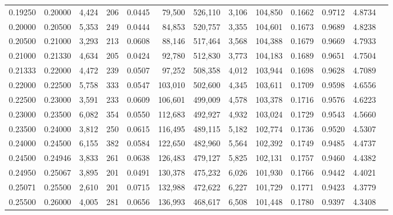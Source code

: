 \begin{tabular}{rrrrrrrrrrrrr}
0.19250 & 0.20000 & 4,424 & 206 &                                     0.0445 &  79,500 & 526,110 &   3,106 & 104,850 & 0.1662 & 0.9712 & 4.8734 \\
0.20000 & 0.20500 & 5,353 & 249 &                                     0.0444 &  84,853 & 520,757 &   3,355 & 104,601 & 0.1673 & 0.9689 & 4.8238 \\
0.20500 & 0.21000 & 3,293 & 213 &                                     0.0608 &  88,146 & 517,464 &   3,568 & 104,388 & 0.1679 & 0.9669 & 4.7933 \\
0.21000 & 0.21330 & 4,634 & 205 &                                     0.0424 &  92,780 & 512,830 &   3,773 & 104,183 & 0.1689 & 0.9651 & 4.7504 \\
0.21333 & 0.22000 & 4,472 & 239 &                                     0.0507 &  97,252 & 508,358 &   4,012 & 103,944 & 0.1698 & 0.9628 & 4.7089 \\
0.22000 & 0.22500 & 5,758 & 333 &                                     0.0547 & 103,010 & 502,600 &   4,345 & 103,611 & 0.1709 & 0.9598 & 4.6556 \\
0.22500 & 0.23000 & 3,591 & 233 &                                     0.0609 & 106,601 & 499,009 &   4,578 & 103,378 & 0.1716 & 0.9576 & 4.6223 \\
0.23000 & 0.23500 & 6,082 & 354 &                                     0.0550 & 112,683 & 492,927 &   4,932 & 103,024 & 0.1729 & 0.9543 & 4.5660 \\
0.23500 & 0.24000 & 3,812 & 250 &                                     0.0615 & 116,495 & 489,115 &   5,182 & 102,774 & 0.1736 & 0.9520 & 4.5307 \\
0.24000 & 0.24500 & 6,155 & 382 &                                     0.0584 & 122,650 & 482,960 &   5,564 & 102,392 & 0.1749 & 0.9485 & 4.4737 \\
0.24500 & 0.24946 & 3,833 & 261 &                                     0.0638 & 126,483 & 479,127 &   5,825 & 102,131 & 0.1757 & 0.9460 & 4.4382 \\
0.24950 & 0.25067 & 3,895 & 201 &                                     0.0491 & 130,378 & 475,232 &   6,026 & 101,930 & 0.1766 & 0.9442 & 4.4021 \\
0.25071 & 0.25500 & 2,610 & 201 &                                     0.0715 & 132,988 & 472,622 &   6,227 & 101,729 & 0.1771 & 0.9423 & 4.3779 \\
0.25500 & 0.26000 & 4,005 & 281 &                                     0.0656 & 136,993 & 468,617 &   6,508 & 101,448 & 0.1780 & 0.9397 & 4.3408 \\

\end{tabular}
